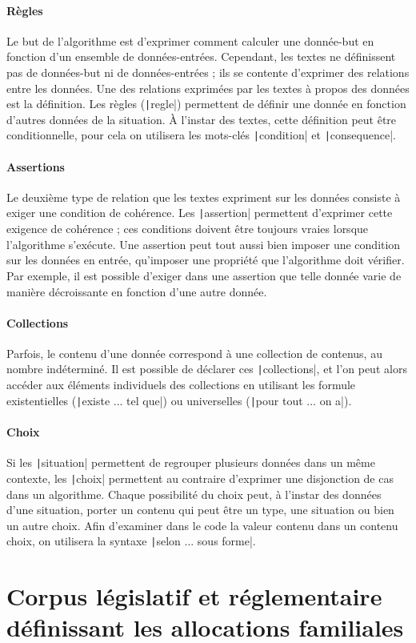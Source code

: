 \documentclass[11pt, french]{article}
\begin{document}
\paragraph{Règles} Le but de l'algorithme est d'exprimer comment calculer une donnée-but en fonction d'un ensemble de données-entrées. Cependant, les textes ne définissent pas de données-but ni de données-entrées ; ils se contente d'exprimer des relations entre les données. Une des relations exprimées par les textes à propos des données est la définition. Les règles (\texttt|regle|) permettent de définir une donnée en fonction d'autres données de la situation. À l'instar des textes, cette définition peut être conditionnelle, pour cela on utilisera les mots-clés \texttt|condition| et \texttt|consequence|.

\paragraph{Assertions} Le deuxième type de relation que les textes expriment sur les données consiste à exiger une condition de cohérence. Les \texttt|assertion| permettent d'exprimer cette exigence de cohérence ; ces conditions doivent être toujours vraies lorsque l'algorithme s'exécute. Une assertion peut tout aussi bien imposer une condition sur les données en entrée, qu'imposer une propriété que l'algorithme doit vérifier. Par exemple, il est possible d'exiger dans une assertion que telle donnée varie de manière décroissante en fonction d'une autre donnée.

\paragraph{Collections} Parfois, le contenu d'une donnée correspond à une collection de contenus, au nombre indéterminé. Il est possible de déclarer ces \texttt|collections|, et l'on peut alors accéder aux éléments individuels des collections en utilisant les formule existentielles (\texttt|existe ... tel que|) ou universelles (\texttt|pour tout ... on a|).

\paragraph{Choix} Si les \texttt|situation| permettent de regrouper plusieurs données dans un même contexte, les \texttt|choix| permettent au contraire d'exprimer une disjonction de cas dans un algorithme. Chaque possibilité du choix peut, à l'instar des données d'une situation, porter un contenu qui peut être un type, une situation ou bien un autre choix. Afin d'examiner dans le code la valeur contenu dans un contenu choix, on utilisera la syntaxe \texttt|selon ... sous forme|.



\section{Corpus législatif et réglementaire définissant les allocations familiales}


\end{document}
